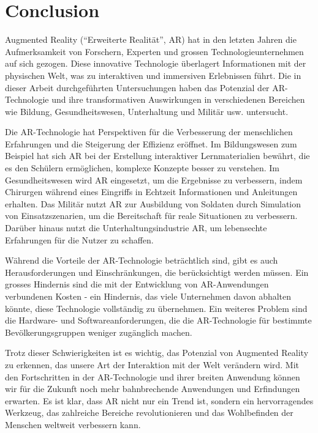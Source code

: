 \section{Conclusion}

Augmented Reality (“Erweiterte Realität”, AR) hat in den letzten Jahren die Aufmerksamkeit von Forschern, Experten und grossen Technologieunternehmen auf sich gezogen. Diese innovative Technologie überlagert Informationen mit der physischen Welt, was zu interaktiven und immersiven Erlebnissen führt. Die in dieser Arbeit durchgeführten Untersuchungen haben das Potenzial der AR-Technologie und ihre transformativen Auswirkungen in verschiedenen Bereichen wie Bildung, Gesundheitswesen, Unterhaltung und Militär usw. untersucht.

Die AR-Technologie hat Perspektiven für die Verbesserung der menschlichen Erfahrungen und die Steigerung der Effizienz eröffnet. Im Bildungswesen zum Beispiel hat sich AR bei der Erstellung interaktiver Lernmaterialien bewährt, die es den Schülern ermöglichen, komplexe Konzepte besser zu verstehen. Im Gesundheitswesen wird AR eingesetzt, um die Ergebnisse zu verbessern, indem Chirurgen während eines Eingriffs in Echtzeit Informationen und Anleitungen erhalten. Das Militär nutzt AR zur Ausbildung von Soldaten durch Simulation von Einsatzszenarien, um die Bereitschaft für reale Situationen zu verbessern. Darüber hinaus nutzt die Unterhaltungsindustrie AR, um lebensechte Erfahrungen für die Nutzer zu schaffen.

Während die Vorteile der AR-Technologie beträchtlich sind, gibt es auch Herausforderungen und Einschränkungen, die berücksichtigt werden müssen. Ein grosses Hindernis sind die mit der Entwicklung von AR-Anwendungen verbundenen Kosten - ein Hindernis, das viele Unternehmen davon abhalten könnte, diese Technologie vollständig zu übernehmen. Ein weiteres Problem sind die Hardware- und Softwareanforderungen, die die AR-Technologie für bestimmte Bevölkerungsgruppen weniger zugänglich machen.

Trotz dieser Schwierigkeiten ist es wichtig, das Potenzial von Augmented Reality zu erkennen, das unsere Art der Interaktion mit der Welt verändern wird. Mit den Fortschritten in der AR-Technologie und ihrer breiten Anwendung können wir für die Zukunft noch mehr bahnbrechende Anwendungen und Erfindungen erwarten. Es ist klar, dass AR nicht nur ein Trend ist, sondern ein hervorragendes Werkzeug, das zahlreiche Bereiche revolutionieren und das Wohlbefinden der Menschen weltweit verbessern kann.